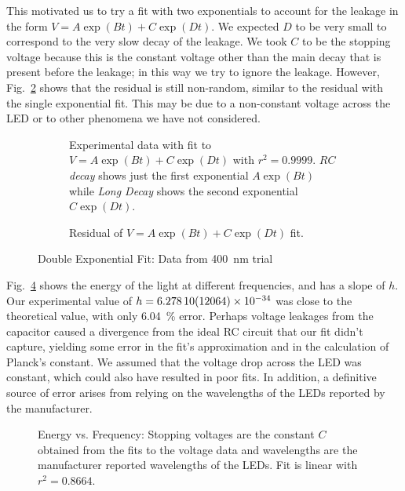 \documentclass{lab}
\begin{document}
This motivated us to try a fit with two exponentials to account for the leakage
in the form $V = A\exp(Bt) + C\exp(Dt)$. We expected $D$ to be very small to
correspond to the very slow decay of the leakage. We took $C$ to be the stopping
voltage because this is the constant voltage other than the main decay that is
present before the leakage; in this way we try to ignore the leakage. However,
Fig.~\ref{fig:complex_resid} shows that the residual is still non-random,
similar to the residual with the single exponential fit. This may be due to a
non-constant voltage across the LED or to other phenomena we have not
considered.

\begin{figure}[h]
  \centering
  \begin{subfigure}{0.48\textwidth}
    \centering
    
    \caption{Experimental data with fit to $V = A\exp(Bt) + C\exp(Dt)$ with $r^2
      = 0.9999$. \textit{$RC$ decay} shows just the first exponential
      $A\exp(Bt)$ while\textit{ Long Decay} shows the second exponential
      $C\exp(Dt)$.\label{fig:complex_fit}}
  \end{subfigure}
  \hfill
  \begin{subfigure}{0.48\textwidth}
    \centering
    
    \caption{Residual of $V = A\exp(Bt) + C\exp(Dt)$
      fit.\label{fig:complex_resid}}
  \end{subfigure}
  \caption{Double Exponential Fit: Data from \SI{400}{\nano\meter}
    trial\label{fig:complex}}
\end{figure}

Fig.~\ref{fig:evsf} shows the energy of the light at different frequencies, and
has a slope of $h$. Our experimental value of $h = \num{6.2781 +- .12064 e-34}$
was close to the theoretical value, with only \SI{6.04}{\percent} error. Perhaps
voltage leakages from the capacitor caused a divergence from the ideal RC
circuit that our fit didn't capture, yielding some error in the fit's
approximation and in the calculation of Planck's constant. We assumed that the
voltage drop across the LED was constant, which could also have resulted in poor
fits. In addition, a definitive source of error arises from relying on the
wavelengths of the LEDs reported by the manufacturer. 

\begin{figure}[h]
  \centering
  
  \caption{Energy vs. Frequency: Stopping voltages are the constant $C$ obtained
    from the fits to the voltage data and wavelengths are the manufacturer
    reported wavelengths of the LEDs. Fit is linear with $r^2 = 0.8664$.\label{fig:evsf}}
\end{figure}
\end{document}
